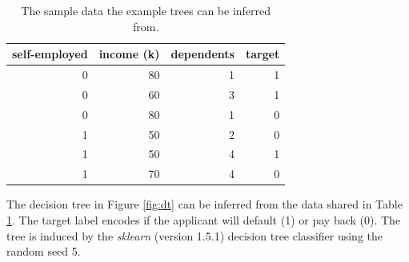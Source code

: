 \documentclass[5p,twocolumn,authoryear]{elsarticle}
\theoremstyle{plain}%
\theoremstyle{remark}%
\theoremstyle{definition}%
\begin{document}
    \begin{table}[tbp]
        \caption{The sample data the example trees can be inferred from.}
        \label{tab:sample}
    \centering
      \begin{tabular}{rrrr}
          \toprule
          self-employed & income (k) & dependents & target \\
          \midrule
          0 & 80 & 1 & 1 \\
          0 & 60 & 3 & 1 \\
          0 & 80 & 1 & 0 \\
          1 & 50 & 2 & 0 \\
          1 & 50 & 4 & 1 \\
          1 & 70 & 4 & 0 \\
          \bottomrule
        \end{tabular}
    \end{table}

    The decision tree in Figure \ref{fig:dt} can be inferred from the data shared in Table \ref{tab:sample}.
    The target label encodes if the applicant will default (1) or pay back (0). The tree is induced by the \emph{sklearn} (version 1.5.1) \citep{sklearn} decision tree classifier using the random seed 5.


\end{document}
